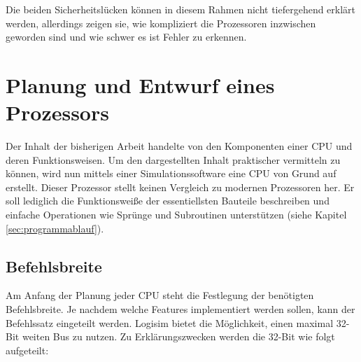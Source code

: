 \documentclass[12pt]{article}
\begin{document}
\par\bigskip\noindent Die beiden Sicherheitslücken können in diesem Rahmen nicht tiefergehend erklärt werden, allerdings zeigen sie, wie kompliziert die Prozessoren inzwischen geworden sind und wie schwer es ist Fehler zu erkennen. 


\newpage
\section{Planung und Entwurf eines Prozessors}
Der Inhalt der bisherigen Arbeit handelte von den Komponenten einer CPU und deren Funktionsweisen. Um den dargestellten Inhalt praktischer vermitteln zu können, wird nun mittels einer Simulationssoftware eine CPU von Grund auf erstellt. Dieser Prozessor stellt keinen Vergleich zu modernen Prozessoren her. Er soll lediglich die Funktionsweiße der essentiellsten Bauteile beschreiben und einfache Operationen wie Sprünge und Subroutinen unterstützen (siehe Kapitel \ref{sec:programmablauf}).
\subsection{Befehlsbreite}
Am Anfang der Planung jeder CPU steht die Festlegung der benötigten Befehlsbreite. Je nachdem welche Features implementiert werden sollen, kann der Befehlssatz eingeteilt werden. Logisim bietet die Möglichkeit, einen maximal 32-Bit weiten Bus zu nutzen. Zu Erklärungszwecken werden die 32-Bit wie folgt aufgeteilt:
\end{document}

